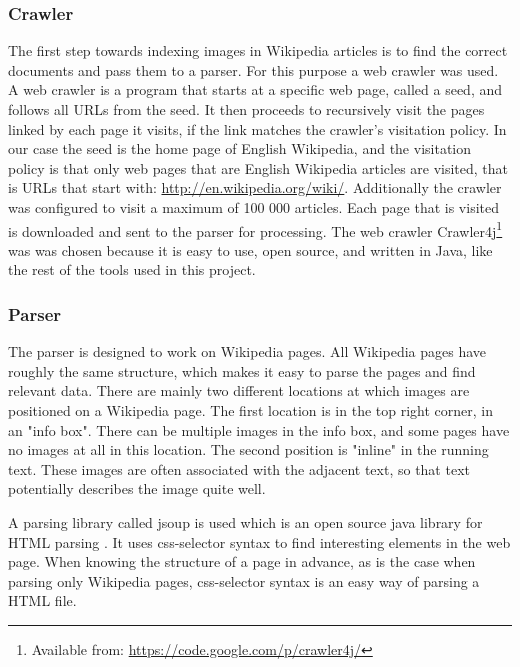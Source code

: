 \documentclass[a4paper]{article}
\begin{document}
\subsubsection{Crawler}
The first step towards indexing images in Wikipedia articles is to find the correct documents and pass them to a parser. For this purpose a web crawler was used. A web crawler is a program that starts at a specific web page, called a seed, and follows all URLs from the seed. It then proceeds to recursively visit the pages linked by each page it visits, if the link matches the crawler's visitation policy. In our case the seed is the home page of English Wikipedia, and the visitation policy is that only web pages that are English Wikipedia articles are visited, that is URLs that start with: \url{http://en.wikipedia.org/wiki/}. Additionally the crawler was configured to visit a maximum of 100 000 articles. Each page that is visited is downloaded and sent to the parser for processing. The web crawler Crawler4j\footnote{Available from: \url{https://code.google.com/p/crawler4j/}} was was chosen because it is easy to use, open source, and written in Java, like the rest of the tools used in this project. 

\subsubsection{Parser}
The parser is designed to work on Wikipedia pages. All Wikipedia pages have roughly the same structure, which makes it easy to parse the pages and find relevant data. There are mainly two different locations at which images are positioned on a Wikipedia page. The first location is in the top right corner, in an "info box". There can be multiple images in the info box, and some pages have no images at all in this location. The second position is "inline" in the running text. These images are often associated with the adjacent text, so that text potentially describes the image quite well.

A parsing library called jsoup is used which is an open source java library for HTML parsing \cite{jsoup}. It uses css-selector syntax to find interesting elements in the web page. When knowing the structure of a page in advance, as is the case when parsing only Wikipedia pages, css-selector syntax is an easy way of parsing a HTML file.
\end{document}
